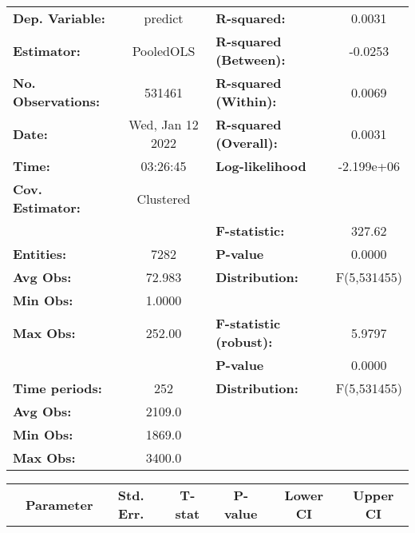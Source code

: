 \begin{center}
\begin{tabular}{lclc}
\toprule
\textbf{Dep. Variable:}    &      predict       & \textbf{  R-squared:         }   &      0.0031      \\
\textbf{Estimator:}        &     PooledOLS      & \textbf{  R-squared (Between):}  &     -0.0253      \\
\textbf{No. Observations:} &       531461       & \textbf{  R-squared (Within):}   &      0.0069      \\
\textbf{Date:}             &  Wed, Jan 12 2022  & \textbf{  R-squared (Overall):}  &      0.0031      \\
\textbf{Time:}             &      03:26:45      & \textbf{  Log-likelihood     }   &    -2.199e+06    \\
\textbf{Cov. Estimator:}   &     Clustered      & \textbf{                     }   &                  \\
\textbf{}                  &                    & \textbf{  F-statistic:       }   &      327.62      \\
\textbf{Entities:}         &        7282        & \textbf{  P-value            }   &      0.0000      \\
\textbf{Avg Obs:}          &       72.983       & \textbf{  Distribution:      }   &   F(5,531455)    \\
\textbf{Min Obs:}          &       1.0000       & \textbf{                     }   &                  \\
\textbf{Max Obs:}          &       252.00       & \textbf{  F-statistic (robust):} &      5.9797      \\
\textbf{}                  &                    & \textbf{  P-value            }   &      0.0000      \\
\textbf{Time periods:}     &        252         & \textbf{  Distribution:      }   &   F(5,531455)    \\
\textbf{Avg Obs:}          &       2109.0       & \textbf{                     }   &                  \\
\textbf{Min Obs:}          &       1869.0       & \textbf{                     }   &                  \\
\textbf{Max Obs:}          &       3400.0       & \textbf{                     }   &                  \\
\bottomrule
\end{tabular}
\begin{tabular}{lcccccc}
                & \textbf{Parameter} & \textbf{Std. Err.} & \textbf{T-stat} & \textbf{P-value} & \textbf{Lower CI} & \textbf{Upper CI}  \\

\end{tabular}
\end{center}
